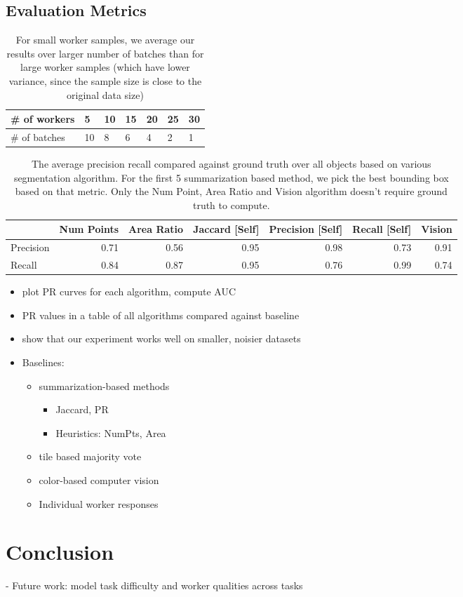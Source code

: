 \documentclass[letterpaper]{article} %
\begin{document}
\subsection{Evaluation Metrics}
\begin{table}[ht]
\centering
\label{batch_sample}
\caption{For small worker samples, we average our results over larger number of batches than for large worker samples (which have lower variance, since the sample size is close to the original data size)}
\begin{tabular}{l|llllll}
\# of workers & 5  & 10 & 15 & 20 & 25 & 30 \\ \hline
\# of batches & 10 & 8  & 6  & 4  & 2  & 1 
\end{tabular}

\end{table}
\begin{table*}[ht]
\begin{tabular}{lrrrrrr}
\hline
           &   Num Points &   Area Ratio &   Jaccard [Self] &   Precision [Self] &   Recall [Self] &   Vision \\
\hline
 Precision &         0.71 &         0.56 &             0.95 &               0.98 &            0.73 &     0.91 \\
 Recall    &         0.84 &         0.87 &             0.95 &               0.76 &            0.99 &     0.74 \\
\hline
\end{tabular}
\caption{The average precision recall compared against ground truth over all objects based on various segmentation algorithm. For the first 5 summarization based method, we pick the best bounding box based on that metric. Only the Num Point, Area Ratio and Vision algorithm doesn't require ground truth to compute.}
\end{table*}

\begin{itemize}
\item plot PR curves for each algorithm, compute AUC
\item PR values in a table of all algorithms compared against baseline
\item show that our experiment works well on smaller, noisier datasets
\item Baselines: 
\begin{itemize}
\item summarization-based methods
\begin{itemize}
\item Jaccard, PR
\item Heuristics: NumPts, Area
\end{itemize}
\item tile based majority vote 
\item color-based computer vision
\item Individual worker responses
\end{itemize}
\end{itemize}
\section{Conclusion}
- Future work: model task difficulty and worker qualities across tasks



\end{document}
